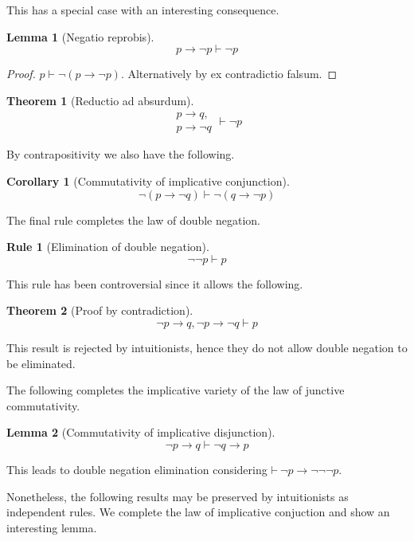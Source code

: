 \documentclass{amsbook}
\newcommand{\infers}{\mathrel\vdash}
\newcommand{\theorem}{\mathord\vdash\medspace}
\newcommand{\then}{\mathrel\rightarrow}
\theoremstyle{definition}
\newtheorem{frule}{Rule}[chapter]
\newtheorem{thm}{Theorem}[section]
\newtheorem{lmm}{Lemma}[section]
\newtheorem{crl}{Corollary}[section]
\begin{document}
This has a special case with an interesting consequence.

\begin{lmm}[Negatio reprobis]
    $$p \then \neg p \infers \neg p$$
    \begin{proof}
        $p \infers \neg(p \then \neg p)$.
        Alternatively by ex contradictio falsum.
    \end{proof}
\end{lmm}

\begin{thm}[Reductio ad absurdum]
    $$\begin{aligned}
            p \then q, \\ p \then \neg q
        \end{aligned} \infers \neg p$$
\end{thm}

By contrapositivity we also have the following.

\begin{crl}[Commutativity of implicative conjunction]
    $$\neg(p \then \neg q) \infers \neg(q \then \neg p)$$
\end{crl}

The final rule completes the law of double negation.

\begin{frule}[Elimination of double negation]
    $${\neg\neg p} \infers p$$
\end{frule}

This rule has been controversial since it allows the following.

\begin{thm}[Proof by contradiction]
    $$\neg p \then q, \neg p \then \neg q \infers p$$
\end{thm}

This result is rejected by intuitionists, hence they do not allow double negation to be eliminated.

The following completes the implicative variety of the law of junctive commutativity.

\begin{lmm}[Commutativity of implicative disjunction]
    $$\neg p \then q \infers \neg q \then p$$
\end{lmm}

This leads to double negation elimination considering $\theorem \neg p \then \neg\neg\neg p$.

Nonetheless, the following results may be preserved by intuitionists as independent rules. We complete the law of implicative conjuction and show an interesting lemma.
\end{document}
